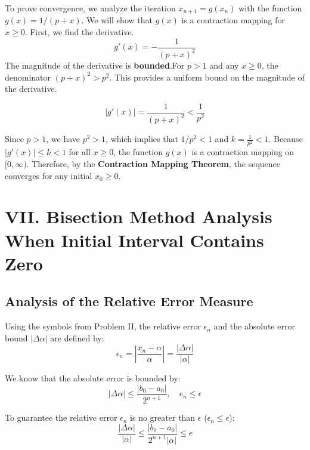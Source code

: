 \documentclass[a4paper]{article}
\begin{document}
To prove convergence, we analyze the iteration $x_{n+1} = g(x_n)$ with the function $g(x) = 1/(p+x)$.
We will show that $g(x)$ is a contraction mapping for $x \ge 0$. First, we find the derivative.
\[
g'(x) = -\frac{1}{(p+x)^2}
\]
The magnitude of the derivative is \textbf{bounded}.For $p > 1$ and any $x \ge 0$, the denominator $(p+x)^2 > p^2$.
This provides a uniform bound on the magnitude of the derivative.

\[
|g'(x)| = \frac{1}{(p+x)^2} < \frac{1}{p^2}
\]

Since $p>1$, we have $p^2 > 1$, which implies that  $1/p^2 < 1$ and $k = \frac{1}{p^2} < 1$.
Because $|g'(x)| \le k < 1$ for all $x \ge 0$, the function $g(x)$ is a contraction mapping on $[0, \infty)$.
Therefore, by the \textbf{Contraction Mapping Theorem}, the sequence converges for any initial $x_0 \ge 0$.
\section*{VII. Bisection Method Analysis When Initial Interval Contains Zero}

\subsection*{Analysis of the Relative Error Measure}

Using the symbols from Problem II, the relative error $\epsilon_n$ and the absolute error bound $|\Delta\alpha|$ are defined by:
\[
\epsilon_n = \left|\frac{x_n - \alpha}{\alpha}\right| = \frac{|\Delta \alpha|}{|\alpha|}
\]

We know that the absolute error is bounded by:
\[
|\Delta \alpha| \leq \frac{|b_0 - a_0|}{2^{n+1}}, \quad e_n \leq \epsilon
\]

To guarantee the relative error $\epsilon_n$ is no greater than $\epsilon$ ($\epsilon_n \leq \epsilon$):
\[
\frac{|\Delta \alpha|}{|\alpha|} \leq \frac{|b_0 - a_0|}{2^{n+1}|\alpha|} \leq \epsilon
\]
\end{document}
